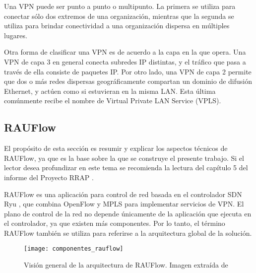 Una VPN puede ser punto a punto o multipunto. La primera se utiliza para conectar sólo dos extremos de una organización, mientras que la segunda se utiliza para brindar conectividad a una organización dispersa en múltiples lugares.

Otra forma de clasificar una VPN es de acuerdo a la capa en la que opera. Una VPN de capa 3 en general conecta subredes IP distintas, y el tráfico que pasa a través de ella consiste de paquetes IP. Por otro lado, una VPN de capa 2 permite que dos o más redes dispersas geográficamente compartan un dominio de difusión Ethernet, y actúen como si estuvieran en la misma LAN. Esta última comúnmente recibe el nombre de Virtual Private LAN Service (VPLS).

\subsection{RAUFlow}
El propósito de esta sección es resumir y explicar los aspectos técnicos de RAUFlow, ya que es la base sobre la que se construye el presente trabajo. Si el lector desea profundizar en este tema se recomienda la lectura del capítulo 5 del informe del Proyecto RRAP \cite{proyecto-rrap}.

RAUFlow es una aplicación para control de red basada en el controlador SDN Ryu \cite{ryu}, que combina OpenFlow y MPLS para implementar servicios de VPN. El plano de control de la red no depende únicamente de la aplicación que ejecuta en el controlador, ya que existen más componentes. Por lo tanto, el término RAUFlow también se utiliza para referirse a la arquitectura global de la solución.

\begin{figure}[t]
	\caption{Visión general de la arquitectura de RAUFlow. Imagen extraída de \cite{proyecto-rrap}}
	\texttt{[image: componentes\_rauflow]}
	\centering
	\label{fig:componentes_rauflow}
\end{figure}


